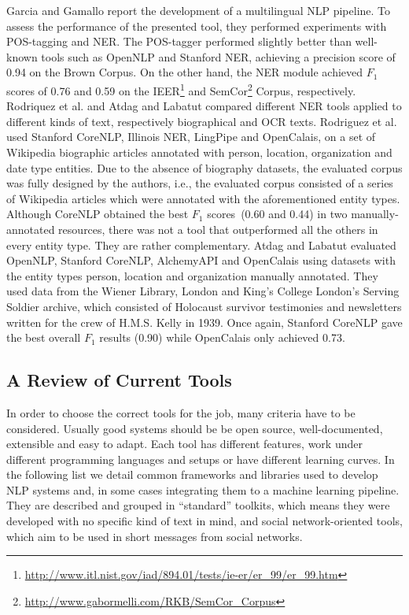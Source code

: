 Garcia and Gamallo \citep{Garcia2015Slate} report the development of a multilingual NLP pipeline. To assess the performance of the presented tool, they performed experiments with POS-tagging and NER. The POS-tagger performed slightly better than well-known tools such as OpenNLP and Stanford NER, achieving a precision score of 0.94 on the Brown Corpus. On the other hand, the NER module achieved $F_1$ scores of 0.76 and 0.59 on the IEER\footnote{\url{http://www.itl.nist.gov/iad/894.01/tests/ie-er/er_99/er_99.htm}} and SemCor\footnote{\url{http://www.gabormelli.com/RKB/SemCor_Corpus}} Corpus, respectively.\\
Rodriquez et al. \citep{rodriquez2012comparison} and Atdag and Labatut \citep{atdag2013comparison} compared different NER tools applied to different kinds of text, respectively biographical and OCR texts. Rodriguez et al. used Stanford CoreNLP, Illinois NER, LingPipe and OpenCalais, on a set of Wikipedia biographic articles annotated with person, location, organization and date type entities. Due to the absence of biography datasets, the evaluated corpus was fully designed by the authors, i.e., the evaluated corpus consisted of a series of Wikipedia articles which were annotated with the aforementioned entity types.  Although CoreNLP obtained the best $F_1$ scores~(0.60 and 0.44) in two manually-annotated resources, there was not a tool that outperformed all the others in every entity type. They are rather complementary. Atdag and Labatut evaluated OpenNLP, Stanford CoreNLP, AlchemyAPI and OpenCalais using datasets with the entity types person, location and organization manually annotated. They used data from the Wiener Library, London and King’s College London’s Serving Soldier archive, which consisted of Holocaust survivor testimonies and newsletters written for the crew of H.M.S. Kelly in 1939. Once again, Stanford CoreNLP gave the best overall $F_1$ results (0.90) while OpenCalais only achieved 0.73.

\subsection{A Review of Current Tools}
\label{nlp_tools}

In order to choose the correct tools for the job, many criteria have to be considered. Usually good systems should be be open source, well-documented, extensible and easy to adapt. Each tool has different features, work under different programming languages and setups or have different learning curves. In the following list we detail common frameworks and libraries used to develop NLP systems and, in some cases integrating them to a machine learning pipeline. They are described and grouped in ``standard'' toolkits, which means they were developed with no specific kind of text in mind, and social network-oriented tools, which aim to be used in short messages from social networks.

